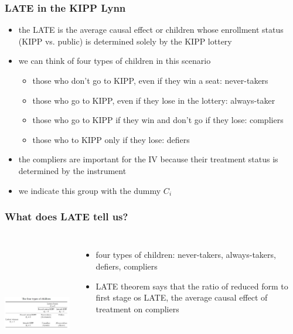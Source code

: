 \documentclass{beamer}
\begin{document}
\begin{frame}
\frametitle{LATE in the KIPP Lynn}
\begin{itemize}
\item the LATE is the average causal effect or children whose enrollment status (KIPP vs. public) is determined solely by the KIPP lottery
\item we can think of four types of children in this scenario
	\begin{itemize}
		\item those who don't go to KIPP, even if they win a seat: never-takers
		\item those who go to KIPP, even if they lose in the lottery: always-taker
		\item those who go to KIPP if they win and don't go if they lose: compliers
		\item those who to KIPP only if they lose: defiers
	\end{itemize}
	\item the compliers are important for the IV because their treatment status is determined by the instrument
	\item we indicate this group with the dummy $C_i$
\end{itemize}

\end{frame}

\begin{frame}
\frametitle{What does LATE tell us?}

\begin{columns}
\includegraphics[width=6.5cm,height=6.5cm,keepaspectratio]{Table 3.2} 

\begin{itemize}
	\item four types of children: never-takers, always-takers, defiers, compliers
	\item LATE theorem says that the ratio of reduced form to first stage os LATE, the average causal effect of treatment on compliers
\end{itemize}

\end{columns}
\end{frame}
\end{document}
